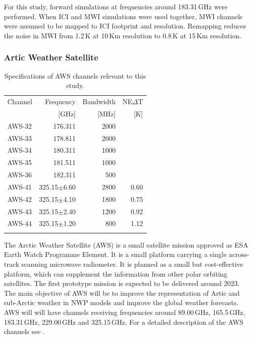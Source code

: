 \documentclass[amt, manuscript]{copernicus}
\begin{document}
For this study, forward simulations at frequencies around 183.31\,GHz were performed. When ICI and MWI simulations were used together, MWI channels were assumed to be mapped to ICI footprint and resolution. Remapping reduces the noise in MWI from 1.2\,K at 10\,Km resolution to 0.8\,K at 15\,Km resolution.  

\subsubsection{Artic Weather Satellite}
%
\begin{table}[t]
	\caption{Specifications of AWS channels relevant to this study.}
	\label{tab:specifications_AWS}	
	\begin{tabular}{lrrr}
		\tophline
		Channel & Frequency 	& Bandwidth & NE$\Delta$T \\
				& [GHz]			& [MHz]		& [K]		\\
		\middlehline
		AWS-32	&	176.311    & 2000	&		\\
		AWS-33	&	178.811    & 2000 	&	\\
		AWS-34	&	180.311    & 1000 	&	\\
		AWS-35	&	181.511    & 1000 	&	 \\
		AWS-36	&	182.311    & \phantom{0}500  &	 \\
		AWS-41  & 325.15$\pm$6.60    & 2800 	 &0.60\\
		AWS-42  & 325.15$\pm$4.10    & 1800    &0.75	\\
		AWS-43  & 325.15$\pm$2.40    & 1200    &0.92\\
		AWS-44  & 325.15$\pm$1.20    & \phantom{0}800  &1.12  \\
		\bottomhline
	\end{tabular}
	\belowtable{} %
\end{table}
The Arctic Weather Satellite (AWS) is a small satellite mission approved as ESA
Earth Watch Programme Element. It is a small platform carrying a single across-track scanning microwave radiometer. It is planned as a small but cost-effective platform, which can supplement the information from other polar orbiting satellites. The first prototype mission is expected to be delivered around 2023. The main objective of AWS will be to improve the representation of Artic and sub-Arctic weather in NWP models and improve the global weather forecasts. AWS will will have channels receiving frequencies around 89.00\,GHz, 165.5\,GHz, 183.31\,GHz, 229.00\,GHz and 325.15\,GHz. For a detailed description of the AWS channels see \citet{eriksson2020study}. 
\end{document}
